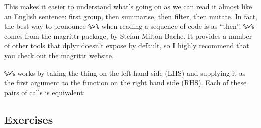 \begin{Shaded}
\end{Shaded}

This makes it easier to understand what's going on as we can read it
almost like an English sentence: first group, then summarise, then
filter, then mutate. In fact, the best way to pronounce
\texttt{\%\textgreater{}\%} when reading a sequence of code is as
``then''. \texttt{\%\textgreater{}\%} comes from the magrittr package,
by Stefan Milton Bache. It provides a number of other tools that dplyr
doesn't expose by default, so I highly recommend that you check out the
\href{https://github.com/smbache/magrittr}{magrittr website}.

\texttt{\%\textgreater{}\%} works by taking the thing on the left hand
side (LHS) and supplying it as the first argument to the function on the
right hand side (RHS). Each of these pairs of calls is equivalent:

\begin{Shaded}
\end{Shaded}

\subsection{Exercises}

